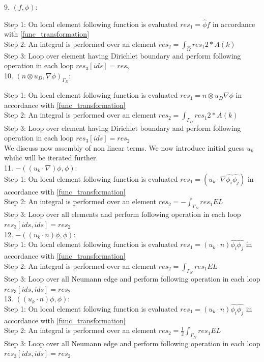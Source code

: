 \documentclass[a4paper,12pt]{book}
\begin{document}
9. $(f,\phi) $:

Step 1: On local element following function is evaluated $res_1= \hat{\phi} f$ in accordance with \ref{func_transformation}\\
Step 2: An integral is performed over an element $res_2=\int_{\hat{\Omega}} res_1 2*A(k)$\\
Step 3: Loop over element having Dirichlet boundary and perform following operation in each loop $res_3[ids]=res_2$\\


10. $(n \otimes u_D,\nabla \phi)_{\Gamma_D} $:

Step 1: On local element following function is evaluated $res_1= n \otimes u_D  \nabla \phi$ in accordance with \ref{func_transformation}\\
Step 2: An integral is performed over an element $res_2=\int_{\Gamma_D} res_1 2*A(k)$\\
Step 3: Loop over element having Dirichlet boundary and perform following operation in each loop $res_3[ids]=res_2$\\

We discuss now assembly of non linear terms. We now introduce initial guess $u_k$ whihc will be iterated further.\\

11. $-((u_k \cdot \nabla)\phi , \phi)$:\\
Step 1: On local element following function is evaluated $res_1 = (u_k \cdot \nabla \hat{\phi_i} \hat{\phi_j}) $ in accordance with \ref{func_transformation}\\
Step 2: An integral is performed over an element $res_2= - \int_{\Gamma_D} res_1 EL$\\
Step 3: Loop over all elements and perform following operation in each loop $res_3[ids,ids]=res_2$\\

12. $-((u_k \cdot n)\phi , \phi)$:\\
Step 1: On local element following function is evaluated $res_1 = (u_k \cdot n) \hat{\phi_i} \hat{\phi_j} $ in accordance with \ref{func_transformation}\\
Step 2: An integral is performed over an element $res_2= \int_{\Gamma_N} res_1 EL $\\
Step 3: Loop over all Neumann edge and perform following operation in each loop $res_3[ids,ids]=res_2$\\

13. $((u_k \cdot n)\phi , \phi)$:\\
Step 1: On local element following function is evaluated $res_1 = (u_k \cdot n) \hat{\phi_i} \hat{\phi_j} $ in accordance with \ref{func_transformation}\\
Step 2: An integral is performed over an element $res_2 = \frac{1}{2}  \int_{\Gamma_N} res_1 EL $\\
Step 3: Loop over all Neumann edge and perform following operation in each loop $res_3[ids,ids] = res_2$\\
\end{document}
